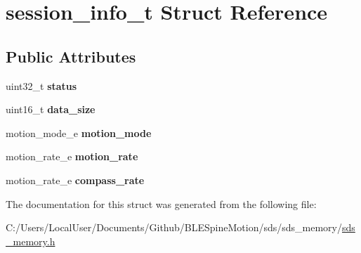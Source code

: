 \hypertarget{structsession__info__t}{}\section{session\+\_\+info\+\_\+t Struct Reference}
\label{structsession__info__t}
\subsection*{Public Attributes}
\begin{DoxyCompactItemize}
\item 
\mbox{\label{structsession__info__t_acaa8e2f29b95c60a30d70719f18d233a}} 
uint32\+\_\+t {\bfseries status}
\item 
\mbox{\label{structsession__info__t_a208fecb35e497384492ef5809ae76b7b}} 
uint16\+\_\+t {\bfseries data\+\_\+size}
\item 
\mbox{\label{structsession__info__t_a3b25e3e55eb56fbc8838fd3b0196fe10}} 
motion\+\_\+mode\+\_\+e {\bfseries motion\+\_\+mode}
\item 
\mbox{\label{structsession__info__t_adb2e6fc2e07b4931940ced8e3ffcfd0a}} 
motion\+\_\+rate\+\_\+e {\bfseries motion\+\_\+rate}
\item 
\mbox{\label{structsession__info__t_a7704b46da51f4850d3560e01923b42a2}} 
motion\+\_\+rate\+\_\+e {\bfseries compass\+\_\+rate}
\end{DoxyCompactItemize}


The documentation for this struct was generated from the following file\+:\begin{DoxyCompactItemize}
\item 
C\+:/\+Users/\+Local\+User/\+Documents/\+Github/\+B\+L\+E\+Spine\+Motion/sds/sds\+\_\+memory/\mbox{\hyperlink{sds__memory_8h}{sds\+\_\+memory.\+h}}\end{DoxyCompactItemize}
